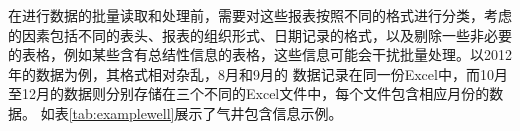 在进行数据的批量读取和处理前，需要对这些报表按照不同的格式进行分类，考虑的因素包括不同的表头、报表的组织形式、日期记录的格式，以及剔除一些非必要的表格，例如某些含有总结性信息的表格，这些信息可能会干扰批量处理。以2012年的数据为例，其格式相对杂乱，8月和9月的
数据记录在同一份Excel中，而10月至12月的数据则分别存储在三个不同的Excel文件中，每个文件包含相应月份的数据。
如表\ref{tab:examplewell}展示了气井包含信息示例。

